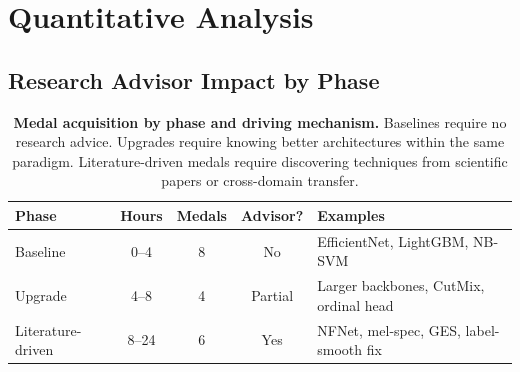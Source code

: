 \documentclass{article}
\begin{document}
\section{Quantitative Analysis}
\label{sec:analysis}

\subsection{Research Advisor Impact by Phase}

\begin{table}[t]
\centering
\caption{\textbf{Medal acquisition by phase and driving mechanism.} Baselines require no research advice. Upgrades require knowing better architectures within the same paradigm. Literature-driven medals require discovering techniques from scientific papers or cross-domain transfer.}
\label{tab:phases}
\small
\begin{tabular}{lcccl}
\toprule
\textbf{Phase} & \textbf{Hours} & \textbf{Medals} & \textbf{Advisor?} & \textbf{Examples} \\
\midrule
Baseline & 0--4 & 8 & No & EfficientNet, LightGBM, NB-SVM \\
Upgrade & 4--8 & 4 & Partial & Larger backbones, CutMix, ordinal head \\
Literature-driven & 8--24 & 6 & Yes & NFNet, mel-spec, GES, label-smooth fix \\
\bottomrule
\end{tabular}
\end{table}
\end{document}
